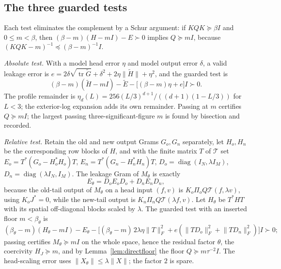\documentclass[11pt]{article}
\numberwithin{equation}{section}
\theoremstyle{definition}
\theoremstyle{remark}
\newcommand{\tr}{\operatorname{tr}}
\newcommand{\norm}[1]{\lVert#1\rVert}
\begin{document}
\subsection{The three guarded tests}\label{sec:tests}
Each test eliminates the complement by a Schur argument: if $KQK\succeq\beta I$ and $0\le m<\beta$, then $(\beta-m)(H-mI)-E\succ0$ implies $Q\succeq mI$, because $(KQK-m)^{-1}\preceq(\beta-m)^{-1}I$.

\emph{Absolute test.} With a model head error $\eta$ and model output error $\delta$, a valid leakage error is $e=2\delta\sqrt{\tr\widetilde G}+\delta^2+2\eta\norm{\widetilde H}+\eta^2$, and the guarded test is
\begin{equation}\label{eq:schur}
 (\beta-m)(\widetilde H-mI)-\widetilde E-\bigl[(\beta-m)\eta+e\bigr]I\succ0 .
\end{equation}
The profile remainder is $\eta_d(L)=256(L/3)^{d+1}/((d+1)(1-L/3))$ for $L<3$; the exterior-log expansion adds its own remainder. Passing at $m$ certifies $Q\succeq mI$; the largest passing three-significant-figure $m$ is found by bisection and recorded.

\emph{Relative test.} Retain the old and new output Grams $G_o,G_n$ separately, let $H_o,H_n$ be the corresponding row blocks of $H$, and with the finite matrix $T$ of $\mathcal T$ set $E_o=T^*(G_o-H_o^*H_o)T$, $E_n=T^*(G_n-H_n^*H_n)T$, $D_o=\operatorname{diag}(I_N,\lambda I_M)$, $D_n=\operatorname{diag}(\lambda I_N,I_M)$. The leakage Gram of $M_\theta$ is exactly
\begin{equation}\label{eq:Etheta}
 E_\theta=D_oE_oD_o+D_nE_nD_n,
\end{equation}
because the old-tail output of $M_\theta$ on a head input $(f,v)$ is $K_o\Pi_oQ\mathcal T(f,\lambda v)$, using $K_oJ^*=0$, while the new-tail output is $K_n\Pi_nQ\mathcal T(\lambda f,v)$. Let $H_\theta$ be $T^*HT$ with its spatial off-diagonal blocks scaled by $\lambda$. The guarded test with an inserted floor $m<\beta_\theta$ is
\begin{equation}\label{eq:reltest}
 (\beta_\theta-m)(H_\theta-mI)-E_\theta-\bigl[(\beta_\theta-m)\,2\lambda\eta\norm T_F^2+e(\norm{TD_o}_F^2+\norm{TD_n}_F^2)\bigr]I\succ0 ;
\end{equation}
passing certifies $M_\theta\succeq mI$ on the whole space, hence the residual factor $\theta$, the coercivity $H_J\succeq m$, and by Lemma~\ref{lem:directfloor} the floor $Q\succeq m\tau^{-2}I$. The head-scaling error uses $\norm{X_\theta}\le\lambda\norm X$; the factor $2$ is spare.
\end{document}
